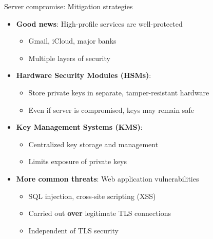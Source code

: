 \documentclass[aspectratio=169, lualatex, handout]{beamer}
\begin{document}
\begin{frame}{Server compromise: Mitigation strategies}
	\begin{itemize}[<+->]
		\item \textbf{Good news}: High-profile services are well-protected
		      \begin{itemize}
			      \item Gmail, iCloud, major banks
			      \item Multiple layers of security
		      \end{itemize}
		\item \textbf{Hardware Security Modules (HSMs)}:
		      \begin{itemize}
			      \item Store private keys in separate, tamper-resistant hardware
			      \item Even if server is compromised, keys may remain safe
		      \end{itemize}
		\item \textbf{Key Management Systems (KMS)}:
		      \begin{itemize}
			      \item Centralized key storage and management
			      \item Limits exposure of private keys
		      \end{itemize}
		\item \textbf{More common threats}: Web application vulnerabilities
		      \begin{itemize}
			      \item SQL injection, cross-site scripting (XSS)
			      \item Carried out \textbf{over} legitimate TLS connections
			      \item Independent of TLS security
		      \end{itemize}
	\end{itemize}
\end{frame}
\end{document}

